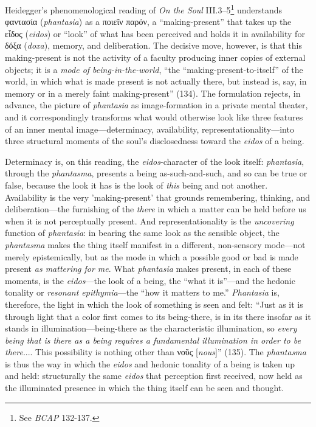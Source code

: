 \documentclass{article}
\newcommand{\gk}[1]{{\greekfont #1}}
\begin{document}
Heidegger's phenomenological reading of \textit{On the Soul} III.3–5\footnote{See \textit{BCAP} 132-137.} understands \gk{φαντασία} (\textit{phantasia}) as a \gk{ποιεῖν παρόν}, a ``making-present'' that takes up the \gk{εἶδος} (\textit{eidos}) or ``look'' of what has been perceived and holds it in availability for \gk{δόξα} (\textit{doxa}), memory, and deliberation. The decisive move, however, is that this making-present is not the activity of a faculty producing inner copies of external objects; it is a \textit{mode of being-in-the-world}, ``the ``making-present-to-itself'' of the world, in which what is made present is not actually there, but instead is, say, in memory or in a merely faint making-present'' (134). The formulation rejects, in advance, the picture of \textit{phantasia} as image-formation in a private mental theater, and it correspondingly transforms what would otherwise look like three features of an inner mental image---determinacy, availability, representationality---into three structural moments of the soul's disclosedness toward the \textit{eidos} of a being.

Determinacy is, on this reading, the \textit{eidos}-character of the look itself: \textit{phantasia}, through the \textit{phantasma}, presents a being as-such-and-such, and so can be true or false, because the look it has is the look of \textit{this} being and not another. Availability is the very 'making-present' that grounds remembering, thinking, and deliberation---the furnishing of the \textit{there} in which a matter can be held before us when it is not perceptually present. And representationality is the \textit{uncovering} function of \textit{phantasia}: in bearing the same look as the sensible object, the \textit{phantasma} makes the thing itself manifest in a different, non-sensory mode---not merely epistemically, but as the mode in which a possible good or bad is made present \textit{as mattering for me}. What \textit{phantasia} makes present, in each of these moments, is the \textit{eidos}---the look of a being, the ``what it is''---and the hedonic tonality or \textit{resonant epithymia}---the ``how it matters to me.'' \textit{Phantasia} is, therefore, the light in which the look of something is seen and felt: ``Just as it is through light that a color first comes to its being-there, is in its there insofar as it stands in illumination---being-there as the characteristic illumination, so \textit{every being that is there as a being requires a fundamental illumination in order to be there}.... This possibility is nothing other than \gk{νοῦς} [\textit{nous}]'' (135). The \textit{phantasma} is thus the way in which the \textit{eidos} and hedonic tonality of a being is taken up and held: structurally the same \textit{eidos} that perception first received, now held as the illuminated presence in which the thing itself can be seen and thought.
\end{document}
